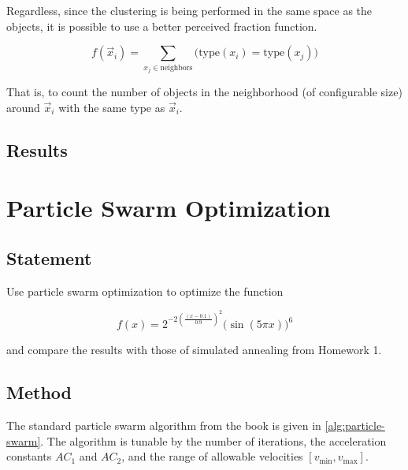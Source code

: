 \documentclass[12pt]{article}
\begin{document}
Regardless, since the clustering is being performed in the same space as the objects, it is
possible to use a better perceived fraction function.

\begin{equation}
    f(\vec x_i) = \sum_{x_j \in \text{neighbors}}\bigg(\mathrm{type}(x_i) =
    \mathrm{type}(x_j)\bigg)\label{eq:aca:density}
\end{equation}

That is, to count the number of objects in the neighborhood (of
configurable size) around $\vec x_i$ with the same type as $\vec x_i$.

\subsection{Results}


\section{Particle Swarm Optimization}

\subsection{Statement}

Use particle swarm optimization to optimize the function

\[f(x) = 2^{-2{\left(\frac{(x - 0.1)}{0.9}\right)}^2}{\big(\sin(5\pi x)\big)}^6\]

and compare the results with those of simulated annealing from Homework 1.

\subsection{Method}

The standard particle swarm algorithm from the book is given in \autoref{alg:particle-swarm}. The
algorithm is tunable by the number of iterations, the acceleration constants $AC_1$ and $AC_2$, and
the range of allowable velocities $[v_{\min}, v_{\max}]$.
\end{document}
